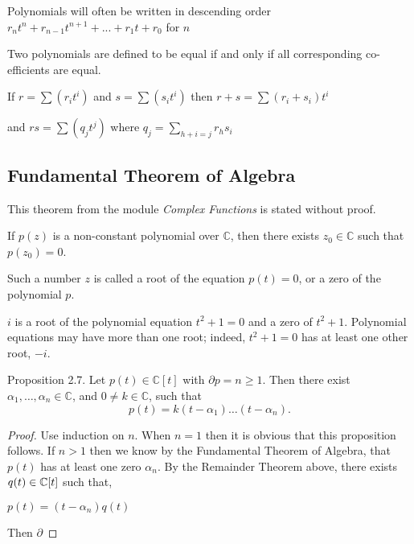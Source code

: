 Polynomials will often be written in descending order $r_n t^n + r_{n-1} t^{n+1} + ... + r_1 t + r_0$ for $n$

Two polynomials are defined to be equal if and only if all corresponding co-efficients are equal.

If $r = \sum (r_i t^i)$ and $s = \sum (s_i t^i)$ then $r+s = \sum (r_i + s_i)t^i$

and $rs = \sum (q_j t^j)$ where $q_j = \sum_{h+i=j} r_h s_i$

\subsection{Fundamental Theorem of Algebra} 
This theorem from the module \textit{Complex Functions} is stated without proof. 

\begin{theorem} \label{thm:fundamental-algebra}
    If $p(z)$ is a non-constant polynomial over $\mathbb{C}$, then there exists $z_0 \in \mathbb{C}$ such that $p\left(z_0\right)=0$.
\end{theorem}

Such a number $z$ is called a root of the equation $p(t)=0$, or a zero of the polynomial $p$. 

\begin{example}
    $i$ is a root of the polynomial equation $t^2+1=0$ and a zero of $t^2+1$. Polynomial equations may have more than one root; indeed, $t^2+1=0$ has at least one other root, $-i$.
\end{example}

Proposition 2.7. Let $p(t) \in \mathbb{C}[t]$ with $\partial p=n \geq 1$. Then there exist $\alpha_1, \ldots, \alpha_n \in \mathbb{C}$, and $0 \neq k \in \mathbb{C}$, such that
$$
p(t)=k\left(t-\alpha_1\right) \ldots\left(t-\alpha_n\right).
$$

\begin{proof}
    Use induction on $n$. When $n = 1$ then it is obvious that this proposition follows. If $n > 1$ then we know by the Fundamental Theorem of Algebra, that $p(t)$ has at least one zero $\alpha_n$. By the Remainder Theorem above, there exists $q(t) \in \mathbb C[t]$ such that,

    $p(t) = (t-\alpha_n) q(t)$

    Then $\partial$
\end{proof}


